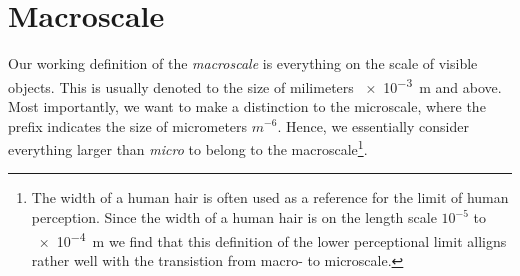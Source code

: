 
















\section{Macroscale}
Our working definition of the \textit{macroscale} is everything on the scale of visible objects. This is usually denoted to the size of milimeters \SI{e-3}{\metre} and above. Most importantly, we want to make a distinction to the microscale, where the prefix indicates the size of micrometers $m^{-6}$. Hence, we essentially consider everything larger than \textit{micro} to belong to the macroscale\footnote{The width of a human hair is often used as a reference for the limit of human perception. Since the width of a human hair is on the length scale $10^{-5}$ to \SI{e-4}{m} we find that this definition of the lower perceptional limit alligns rather well with the transistion from macro- to microscale.}.

